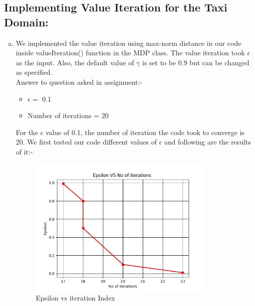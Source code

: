 \documentclass{article}
\begin{document}
\subsection{Implementing Value Iteration for the Taxi Domain:}
\begin{enumerate}[a)]
    \item We implemented the value iteration using max-norm distance in our code inside valueIteration() function in the MDP class. The value iteration took $\epsilon$ as the input. Also, the default value of $\gamma$ is set to be 0.9 but can be changed as specified.\\
    Answer to question asked in assignment:- 
    \begin{itemize}
        \item $\epsilon = $ 0.1 
        \item Number of iterations = 20
    \end{itemize}
    
    For the $\epsilon$ value of 0.1, the number of iteration the code took to converge is 20. We first tested our code different values of $\epsilon$ and following are the results of it:- 
    \begin{center}
        \begin{figure}[H]
        \hfill\includegraphics[width=9cm]{QA2a.png}\hspace*{\fill}
        \caption{Epsilon vs iteration Index}
        \label{fig:Epsilon vs iteration Index}
    \end{figure}
    \end{center}
    

\end{enumerate}
\end{document}
